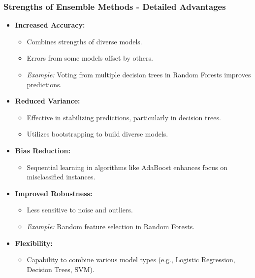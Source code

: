 \documentclass[aspectratio=169]{beamer}
\begin{document}
\begin{frame}[fragile]
    \frametitle{Strengths of Ensemble Methods - Detailed Advantages}
    \begin{itemize}
        \item \textbf{Increased Accuracy:}
        \begin{itemize}
            \item Combines strengths of diverse models.
            \item Errors from some models offset by others.
            \item \textit{Example:} Voting from multiple decision trees in Random Forests improves predictions.
        \end{itemize}
    
        \item \textbf{Reduced Variance:}
        \begin{itemize}
            \item Effective in stabilizing predictions, particularly in decision trees.
            \item Utilizes bootstrapping to build diverse models.
        \end{itemize}
    
        \item \textbf{Bias Reduction:}
        \begin{itemize}
            \item Sequential learning in algorithms like AdaBoost enhances focus on misclassified instances.
        \end{itemize}
    
        \item \textbf{Improved Robustness:}
        \begin{itemize}
            \item Less sensitive to noise and outliers.
            \item \textit{Example:} Random feature selection in Random Forests.
        \end{itemize}
    
        \item \textbf{Flexibility:}
        \begin{itemize}
            \item Capability to combine various model types (e.g., Logistic Regression, Decision Trees, SVM).
        \end{itemize}
    \end{itemize}
\end{frame}
\end{document}
